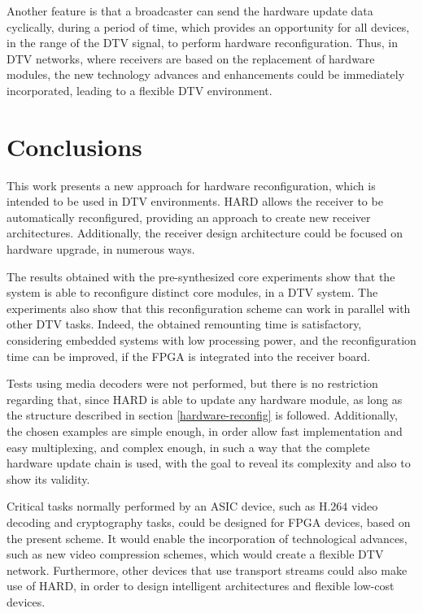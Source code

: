 Another feature is that a broadcaster can send the hardware update data cyclically, during a period of time, which provides an opportunity for all devices, in the range of the DTV signal, to perform hardware reconfiguration. Thus, in DTV networks, where receivers are based on the replacement of hardware modules, the new technology advances and enhancements could be immediately incorporated, leading to a flexible DTV environment.

\section{Conclusions}
\label{conclu}

This work presents a new approach for hardware reconfiguration, which is intended to be used in DTV environments. HARD allows the receiver to be automatically reconfigured, providing an approach to create new receiver architectures. Additionally, the receiver design architecture could be focused on hardware upgrade, in numerous ways.

The results obtained with the pre-synthesized core experiments show that the system is able to reconfigure distinct core modules, in a DTV system. The experiments also show that this reconfiguration scheme can work in parallel with other DTV tasks. Indeed, the obtained remounting time is satisfactory, considering embedded systems with low processing power, and the reconfiguration time can be improved, if the FPGA is integrated into the receiver board. 

Tests using media decoders were not performed, but there is no restriction regarding that, since HARD is able to update any hardware module, as long as the structure described in section \ref{hardware-reconfig} is followed. Additionally, the chosen examples are simple enough, in order allow fast implementation and easy multiplexing, and complex enough, in such a way that the complete hardware update chain is used, with the goal to reveal its complexity and also to show its validity.

Critical tasks normally performed by an ASIC device, such as H.$264$ video decoding and cryptography tasks, could be designed for FPGA devices, based on the present scheme. It would enable the incorporation of technological advances, such as new video compression schemes, which would create a flexible DTV network. Furthermore, other devices that use transport streams could also make use of HARD, in order to design intelligent architectures and flexible low-cost devices.

